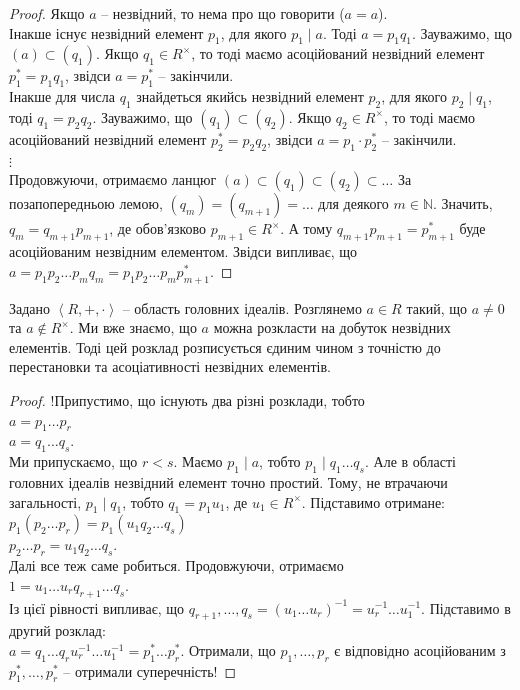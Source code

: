 \documentclass{math_library}
\begin{document}
\begin{proof}
Якщо $a$ -- незвідний, то нема про що говорити ($a = a$).\\
Інакше існує незвідний елемент $p_1$, для якого $p_1 \mid a$. Тоді $a = p_1 q_1$. Зауважимо, що $(a) \subset (q_1)$. Якщо $q_1 \in R^\times$, то тоді маємо асоційований незвідний елемент $p_1^* = p_1 q_1$, звідси $a = p_1^*$ -- закінчили.\\
Інакше для числа $q_1$ знайдеться якийсь незвідний елемент $p_2$, для якого $p_2 \mid q_1$, тоді $q_1 = p_2 q_2$. Зауважимо, що $(q_1) \subset (q_2)$. Якщо $q_2 \in R^\times$, то тоді маємо асоційований незвідний елемент $p_2^* = p_2 q_2$, звідси $a = p_1 \cdot p_2^*$ -- закінчили.\\
$\vdots$\\
Продовжуючи, отримаємо ланцюг $(a) \subset (q_1) \subset (q_2) \subset \dots$ За позапопередньою лемою, $(q_m) = (q_{m+1}) = \dots$ для деякого $m \in \mathbb{N}$. Значить, $q_m = q_{m+1} p_{m+1}$, де обов'язково $p_{m+1} \in R^\times$. А тому $q_{m+1} p_{m+1} = p_{m+1}^*$ буде асоційованим незвідним елементом. Звідси випливає, що $a = p_1p_2 \dots p_m q_m = p_1 p_2 \dots p_m p_{m+1}^*$.
\end{proof}

\begin{lemma}
Задано $\left<R,+,\cdot \right>$ -- область головних ідеалів. Розглянемо $a \in R$ такий, що $a \neq 0$ та $a \notin R^\times$. Ми вже знаємо, що $a$ можна розкласти на добуток незвідних елементів. Тоді цей розклад розписується єдиним чином з точністю до перестановки та асоціативності незвідних елементів.
\end{lemma}

\begin{proof}
!Припустимо, що існують два різні розклади, тобто\\
$a = p_1 \dots p_r$\\
$a = q_1 \dots q_s$.\\
Ми припускаємо, що $r < s$. Маємо $p_1 \mid a$, тобто $p_1 \mid q_1 \dots q_s$. Але в області головних ідеалів незвідний елемент точно простий. Тому, не втрачаючи загальності, $p_1 \mid q_1$, тобто $q_1 = p_1 u_1$, де $u_1 \in R^\times$. Підставимо отримане:\\
$p_1 ( p_2 \dots p_r) = p_1 (u_1 q_2 \dots q_s)$\\
$p_2 \dots p_r = u_1 q_2 \dots q_s$.\\
Далі все теж саме робиться. Продовжуючи, отримаємо\\
$1 = u_1 \dots u_r q_{r+1} \dots q_s$.\\
Із цієї рівності випливає, що $q_{r+1},\dots,q_s = (u_1 \dots u_r)^{-1} = u_r^{-1} \dots u_1^{-1}$. Підставимо в другий розклад:\\
$a = q_1 \dots q_r u_r^{-1} \dots u_1^{-1} = p_1^* \dots p_r^*$. Отримали, що $p_1,\dots,p_r$ є відповідно асоційованим з $p_1^*,\dots,p_r^*$ -- отримали суперечність!
\end{proof}
\end{document}

